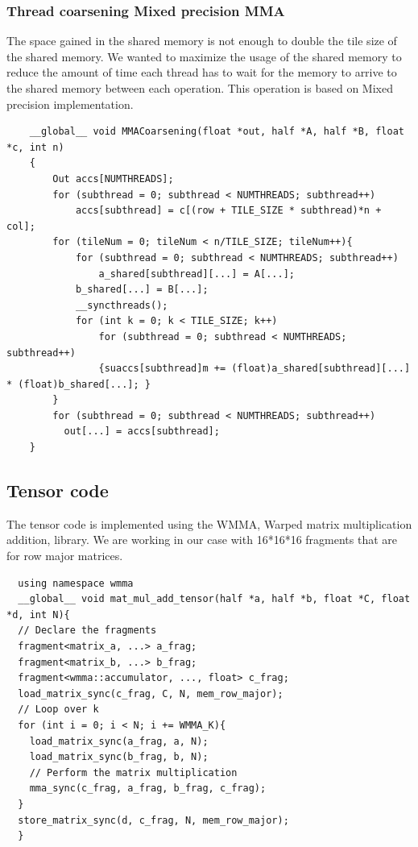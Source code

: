 \documentclass[conference]{IEEEtran}
\begin{document}
  \subsubsection[short]{Thread coarsening Mixed precision MMA}
  The space gained in the shared memory is not enough to double the tile size of the shared memory. We wanted 
  to maximize the usage of the shared memory to reduce the amount of time each thread has to wait for the memory
  to arrive to the shared memory between each operation. This operation is based on Mixed precision implementation.\cite{mem_cud}
  \begin{lstlisting}
    __global__ void MMACoarsening(float *out, half *A, half *B, float *c, int n)
    {   
        Out accs[NUMTHREADS];
        for (subthread = 0; subthread < NUMTHREADS; subthread++)
            accs[subthread] = c[(row + TILE_SIZE * subthread)*n + col];
        for (tileNum = 0; tileNum < n/TILE_SIZE; tileNum++){
            for (subthread = 0; subthread < NUMTHREADS; subthread++)
                a_shared[subthread][...] = A[...];
            b_shared[...] = B[...];
            __syncthreads();
            for (int k = 0; k < TILE_SIZE; k++)
                for (subthread = 0; subthread < NUMTHREADS; subthread++)
                {suaccs[subthread]m += (float)a_shared[subthread][...] * (float)b_shared[...]; }
        }
        for (subthread = 0; subthread < NUMTHREADS; subthread++)
          out[...] = accs[subthread];
    }
  \end{lstlisting}
  
  
  \subsection{Tensor code}\label{sec:TensorCode}
  The tensor code is implemented using the WMMA,  Warped matrix multiplication addition,
  library. We are working in our case with 16*16*16 fragments that are for row major matrices.
  \begin{lstlisting}
  using namespace wmma
  __global__ void mat_mul_add_tensor(half *a, half *b, float *C, float *d, int N){
  // Declare the fragments
  fragment<matrix_a, ...> a_frag;
  fragment<matrix_b, ...> b_frag;
  fragment<wmma::accumulator, ..., float> c_frag;
  load_matrix_sync(c_frag, C, N, mem_row_major);
  // Loop over k
  for (int i = 0; i < N; i += WMMA_K){
    load_matrix_sync(a_frag, a, N);
    load_matrix_sync(b_frag, b, N);
    // Perform the matrix multiplication
    mma_sync(c_frag, a_frag, b_frag, c_frag);
  }
  store_matrix_sync(d, c_frag, N, mem_row_major);
  }
  \end{lstlisting}
\end{document}
